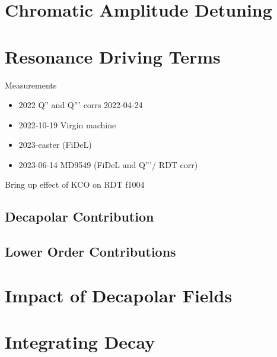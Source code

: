 


\section{Chromatic Amplitude Detuning}

\section{Resonance Driving Terms}

Measurements 

\begin{itemize}
    \item 2022 Q'' and Q''' corrs 2022-04-24
    \item 2022-10-19 Virgin machine
    \item 2023-easter (FiDeL)
    \item 2023-06-14 MD9549 (FiDeL and Q'''/ RDT corr)
\end{itemize}

Bring up effect of KCO on RDT f1004

\subsection{Decapolar Contribution}

\subsection{Lower Order Contributions}

\section{Impact of Decapolar Fields}

\section{Integrating Decay}